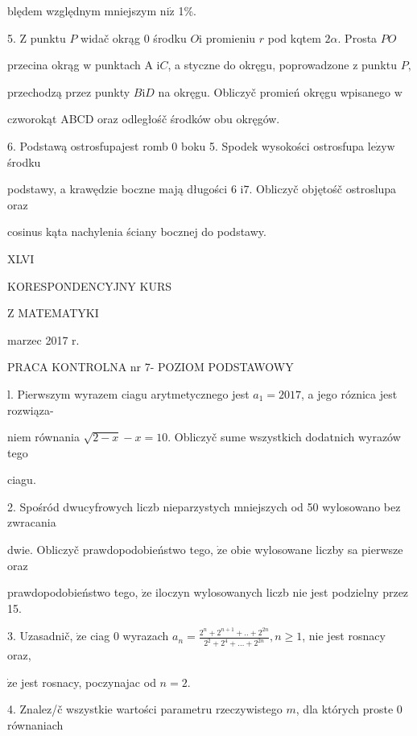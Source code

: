 \documentclass[a4paper,12pt]{article}
\begin{document}
blędem względnym mniejszym $\mathrm{n}\mathrm{i}\dot{\mathrm{z}}$ 1\%.

5. $\mathrm{Z}$ punktu $P$ widač okrąg $0$ środku $O \mathrm{i}$ promieniu $r$ pod kqtem $ 2\alpha$. Prosta $PO$

przecina okrąg $\mathrm{w}$ punktach A $\mathrm{i}C$, a styczne do okręgu, poprowadzone $\mathrm{z}$ punktu $P,$

przechodzą przez punkty $B\mathrm{i}D$ na okręgu. Obliczyč promień okręgu wpisanego $\mathrm{w}$

czworokąt ABCD oraz odległośč środków obu okręgów.

6. Podstawą ostrosfupajest romb $0$ boku 5. Spodek wysokości ostrosfupa $\mathrm{l}\mathrm{e}\dot{\mathrm{z}}\mathrm{y}\mathrm{w}$ środku

podstawy, a krawędzie boczne mają długości 6 $\mathrm{i}7$. Obliczyč objętośč ostroslupa oraz

cosinus kąta nachylenia ściany bocznej do podstawy.







XLVI

KORESPONDENCYJNY KURS

Z MATEMATYKI

marzec 2017 r.

PRACA KONTROLNA nr 7- POZIOM PODSTAWOWY

l. Pierwszym wyrazem ciagu arytmetycznego jest $a_{1}=2017$, a jego róznica jest rozwiąza-

niem równania $\sqrt{2-x}-x = 10$. Obliczyč sume wszystkich dodatnich wyrazów tego

ciagu.

2. Spośród dwucyfrowych liczb nieparzystych mniejszych od 50 wylosowano bez zwracania

dwie. Obliczyč prawdopodobieństwo tego, $\dot{\mathrm{z}}\mathrm{e}$ obie wylosowane liczby sa pierwsze oraz

prawdopodobieństwo tego, $\dot{\mathrm{z}}\mathrm{e}$ iloczyn wylosowanych liczb nie jest podzielny przez 15.

3. Uzasadnič, $\dot{\mathrm{z}}\mathrm{e}$ ciag $0$ wyrazach $a_{n}=\displaystyle \frac{2^{n}+2^{n+1}+..+2^{2n}}{2^{2}+2^{4}+\ldots+2^{2n}}, n\geq 1$, nie jest rosnacy oraz,

$\dot{\mathrm{z}}\mathrm{e}$ jest rosnacy, poczynajac od $n=2.$

4. Znalez/č wszystkie wartości parametru rzeczywistego $m$, dla których proste $0$ równaniach
\end{document}
